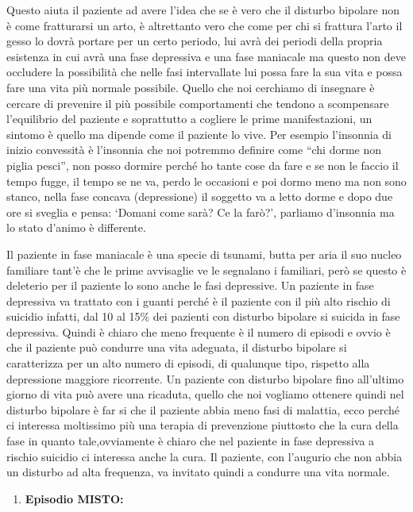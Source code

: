 \documentclass[]{article}
\begin{document}
Questo aiuta il paziente ad avere l'idea che se è vero che il disturbo
bipolare non è come fratturarsi un arto, è altrettanto vero che come per
chi si frattura l'arto il gesso lo dovrà portare per un certo periodo,
lui avrà dei periodi della propria esistenza in cui avrà una fase
depressiva e una fase maniacale ma questo non deve occludere la
possibilità che nelle fasi intervallate lui possa fare la sua vita e
possa fare una vita più normale possibile. Quello che noi cerchiamo di
insegnare è cercare di prevenire il più possibile comportamenti che
tendono a scompensare l'equilibrio del paziente e soprattutto a cogliere
le prime manifestazioni, un sintomo è quello ma dipende come il paziente
lo vive. Per esempio l'insonnia di inizio convessità è l'insonnia che
noi potremmo definire come ``chi dorme non piglia pesci'', non posso
dormire perché ho tante cose da fare e se non le faccio il tempo fugge,
il tempo se ne va, perdo le occasioni e poi dormo meno ma non sono
stanco, nella fase concava (depressione) il soggetto va a letto dorme e
dopo due ore si sveglia e pensa: `Domani come sarà? Ce la farò?',
parliamo d'insonnia ma lo stato d'animo è differente.

Il paziente in fase maniacale è una specie di tsunami, butta per aria il
suo nucleo familiare tant'è che le prime avvisaglie ve le segnalano i
familiari, però se questo è deleterio per il paziente lo sono anche le
fasi depressive. Un paziente in fase depressiva va trattato con i guanti
perché è il paziente con il più alto rischio di suicidio infatti, dal 10
al 15\% dei pazienti con disturbo bipolare si suicida in fase
depressiva. Quindi è chiaro che meno frequente è il numero di episodi e
ovvio è che il paziente può condurre una vita adeguata, il disturbo
bipolare si caratterizza per un alto numero di episodi, di qualunque
tipo, rispetto alla depressione maggiore ricorrente. Un paziente con
disturbo bipolare fino all'ultimo giorno di vita può avere una ricaduta,
quello che noi vogliamo ottenere quindi nel disturbo bipolare è far si
che il paziente abbia meno fasi di malattia, ecco perché ci interessa
moltissimo più una terapia di prevenzione piuttosto che la cura della
fase in quanto tale,ovviamente è chiaro che nel paziente in fase
depressiva a rischio suicidio ci interessa anche la cura. Il paziente,
con l'augurio che non abbia un disturbo ad alta frequenza, va invitato
quindi a condurre una vita normale.

\begin{enumerate}
\def\labelenumi{\arabic{enumi}.}
\item
  \textbf{Episodio MISTO:}
\end{enumerate}
\end{document}
